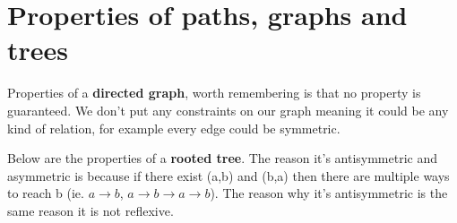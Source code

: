 \documentclass[twocolumn,a4paper]{article}
\begin{document}
\newpage
\section*{Properties of paths, graphs and trees}
Properties of a \textbf{directed graph}, worth remembering is that no property is guaranteed.
We don't put any constraints on our graph meaning it could be any kind of relation,
for example every edge could be symmetric.
\begin{figure}[ht]
	\centering
\end{figure}

Below are the properties of a \textbf{rooted tree}.
The reason it's antisymmetric and asymmetric is because if there exist (a,b) and (b,a) then there are multiple ways to reach b
(ie. \(a\rightarrow b\), \(a\rightarrow b\rightarrow a\rightarrow b\)).
The reason why it's antisymmetric is the same reason it is not reflexive.
\begin{figure}[ht]
	\centering
\end{figure}
\end{document}
